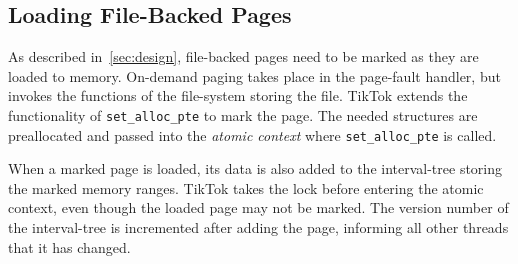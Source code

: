 \documentclass[conference]{IEEEtran}
\newcommand{\sysname}{TikTok}
\begin{document}
\subsection{Loading File-Backed Pages}

As described in~\autoref{sec:design}, file-backed pages need to be marked as
they are loaded to memory. On-demand paging takes place in the page-fault
handler, but invokes the functions of the file-system storing the file. \sysname{}
extends the functionality of \texttt{set\_alloc\_pte} to mark the page. The
needed structures are preallocated and passed into the \emph{atomic context} where 
\texttt{set\_alloc\_pte} is called.

When a marked page is loaded, its data is also added to the interval-tree
storing the marked memory ranges. \sysname{} takes the lock before entering the
atomic context, even though the loaded page may not be marked. The version
number of the interval-tree is incremented after adding the page, informing all
other threads that it has changed.
\end{document}
